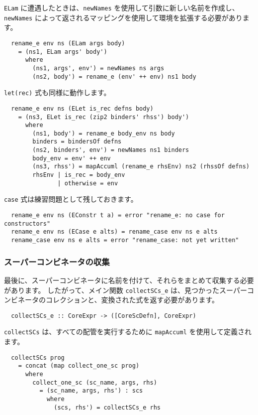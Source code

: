 \documentclass{jarticle}
\begin{document}
\texttt{ELam} に遭遇したときは、\texttt{newNames} を使用して引数に新しい名前を作成し、
\texttt{newNames} によって返されるマッピングを使用して環境を拡張する必要があります。

\begin{verbatim}
  rename_e env ns (ELam args body)
    = (ns1, ELam args' body')
      where
        (ns1, args', env') = newNames ns args
        (ns2, body') = rename_e (env' ++ env) ns1 body
\end{verbatim}

\texttt{let(rec)} 式も同様に動作します。

\begin{verbatim}
  rename_e env ns (ELet is_rec defns body)
    = (ns3, ELet is_rec (zip2 binders' rhss') body')
      where
        (ns1, body') = rename_e body_env ns body
        binders = bindersOf defns
        (ns2, binders', env') = newNames ns1 binders
        body_env = env' ++ env
        (ns3, rhss') = mapAccuml (rename_e rhsEnv) ns2 (rhssOf defns)
        rhsEnv | is_rec = body_env
               | otherwise = env
\end{verbatim}

\texttt{case} 式は練習問題として残しておきます。

\begin{verbatim}
  rename_e env ns (EConstr t a) = error "rename_e: no case for constructors"
  rename_e env ns (ECase e alts) = rename_case env ns e alts
  rename_case env ns e alts = error "rename_case: not yet written"
\end{verbatim}

\subsubsection{スーパーコンビネータの収集}

最後に、スーパーコンビネータに名前を付けて、それらをまとめて収集する必要があります。
したがって、メイン関数 \texttt{collectSCs\_e} は、見つかったスーパーコンビネータのコレクションと、変換された式を返す必要があります。

\begin{verbatim}
  collectSCs_e :: CoreExpr -> ([CoreScDefn], CoreExpr)
\end{verbatim}

\texttt{collectSCs} は、すべての配管を実行するために \texttt{mapAccuml} を使用して定義されます。

\begin{verbatim}
  collectSCs prog
    = concat (map collect_one_sc prog)
      where
        collect_one_sc (sc_name, args, rhs)
          = (sc_name, args, rhs') : scs
            where
              (scs, rhs') = collectSCs_e rhs
\end{verbatim}
\newpage
\end{document}
